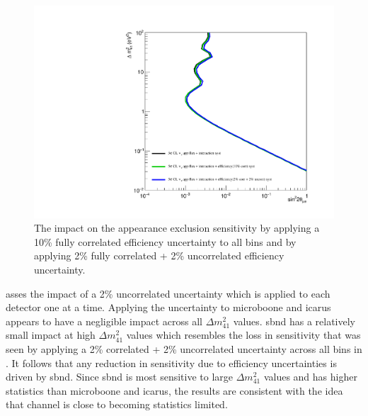 \begin{figure}[h!]
    \centering
    \includegraphics[width = \largefigwidth]{figures-chap6/exclusion_contours/efficiency_systematics/nue_app_cor_uncor.pdf}
    \caption[Impact of correlated and uncorrelated efficiency systematics on the \nue appearance sensitivity.]{The impact on the \nue appearance exclusion sensitivity by applying a 10\% fully correlated efficiency uncertainty to all bins and by applying 2\% fully correlated + 2\% uncorrelated efficiency uncertainty.}
    \label{fig:nue_app_corr_uncorr_error}
\end{figure}

 asses the impact of a 2\% uncorrelated uncertainty which is applied to each detector one at a time. Applying the uncertainty to \gls{microboone} and \gls{icarus} appears to have a negligible impact across all $\Delta m^2_{41}$ values. \gls{sbnd} has a relatively small impact at high $\Delta m^2_{41}$ values which resembles the loss in sensitivity that was seen by applying a 2\% correlated + 2\% uncorrelated uncertainty across all bins in . It follows that any reduction in sensitivity due to efficiency uncertainties is driven by \gls{sbnd}. Since \gls{sbnd} is most sensitive to large $\Delta m^2_{41}$ values and has higher statistics than \gls{microboone} and \gls{icarus}, the results are consistent with the idea that \nue channel is close to becoming statistics limited. 

